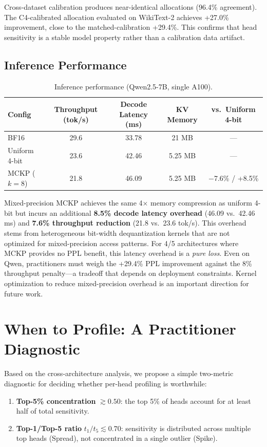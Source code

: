 \documentclass[11pt,a4paper]{article}
\begin{document}
Cross-dataset calibration produces near-identical allocations (96.4\% agreement).
The C4-calibrated allocation evaluated on WikiText-2 achieves +27.0\% improvement, close to the matched-calibration +29.4\%.
This confirms that head sensitivity is a stable model property rather than a calibration data artifact.

\subsection{Inference Performance}\label{sec:runtime}

\begin{table}[h]
\centering
\caption{Inference performance (Qwen2.5-7B, single A100).}
\label{tab:runtime}
\small
\begin{tabular}{lcccc}
\toprule
Config & Throughput (tok/s) & Decode Latency (ms) & KV Memory & vs.\ Uniform 4-bit \\
\midrule
BF16 & 29.6 & 33.78 & 21 MB & --- \\
Uniform 4-bit & 23.6 & 42.46 & 5.25 MB & --- \\
MCKP ($k\!=\!8$) & 21.8 & 46.09 & 5.25 MB & $-$7.6\% / +8.5\% \\
\bottomrule
\end{tabular}
\end{table}

Mixed-precision MCKP achieves the same 4$\times$ memory compression as uniform 4-bit but incurs an additional \textbf{8.5\% decode latency overhead} (46.09 vs.\ 42.46 ms) and \textbf{7.6\% throughput reduction} (21.8 vs.\ 23.6 tok/s).
This overhead stems from heterogeneous bit-width dequantization kernels that are not optimized for mixed-precision access patterns.
For 4/5 architectures where MCKP provides no PPL benefit, this latency overhead is a \emph{pure loss}.
Even on Qwen, practitioners must weigh the +29.4\% PPL improvement against the 8\% throughput penalty---a tradeoff that depends on deployment constraints.
Kernel optimization to reduce mixed-precision overhead is an important direction for future work.

\section{When to Profile: A Practitioner Diagnostic}\label{sec:diagnostic}

Based on the cross-architecture analysis, we propose a simple two-metric diagnostic for deciding whether per-head profiling is worthwhile:
\begin{enumerate}[nosep]
\item \textbf{Top-5\% concentration} $\gtrsim 0.50$: the top 5\% of heads account for at least half of total sensitivity.
\item \textbf{Top-1/Top-5 ratio} $t_1/t_5 \lesssim 0.70$: sensitivity is distributed across multiple top heads (Spread), not concentrated in a single outlier (Spike).
\end{enumerate}
\end{document}
